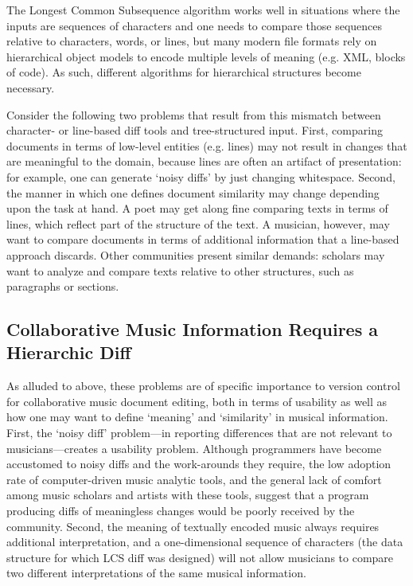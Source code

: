 \documentclass{article}
\begin{document}
The Longest Common Subsequence algorithm works well in situations where
the inputs are sequences of characters and one needs to compare those sequences relative to characters, words, or
lines, but many modern file formats rely on
hierarchical object models to encode multiple levels of meaning
(e.g. XML, blocks of code).  As such, different algorithms for
hierarchical structures become necessary.  

Consider the following two problems that result from this mismatch
between character- or line-based diff tools and tree-structured input.
First, comparing documents in terms of low-level entities
(e.g. lines) may not result in changes that are meaningful to the
domain, because lines are often an artifact of presentation: for
example, one can generate `noisy diffs' by just changing whitespace.
Second, the manner in which one defines document similarity may change
depending upon the task at hand.  A poet may get along fine comparing
texts in terms of lines, which reflect part of the structure of the
text.  A musician, however, may want to compare documents in terms of
additional information that a line-based approach discards.
Other communities present similar demands: scholars may want
to analyze and compare texts relative to other structures, such as
paragraphs or sections.

\subsection{Collaborative Music Information Requires a Hierarchic Diff}
As alluded to above, these problems are of specific importance to version control for collaborative music document editing, both in terms of usability as well as how one may want
to define `meaning' and `similarity' in musical information.  First,
the `noisy diff' problem---in reporting differences that are not
relevant to musicians---creates a usability problem.  Although
programmers have become accustomed to noisy diffs and the work-arounds
they require, the low adoption rate of computer-driven music analytic
tools, and the general lack of comfort among music scholars and artists with these
tools, suggest that a program producing diffs of meaningless changes
would be poorly received by the community.  Second, the meaning of
textually encoded music always requires additional interpretation, and a one-dimensional sequence of characters (the data
structure for which LCS diff was designed) will not allow
musicians to compare two different interpretations of the same musical information.  
\end{document}
